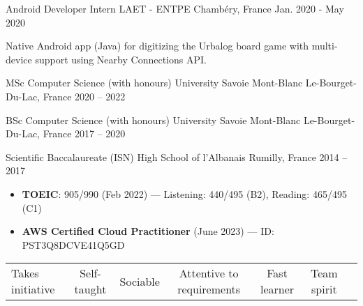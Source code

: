 \documentclass[11pt, a4paper]{awesome-cv}
\begin{document}
\begin{cventries}
  \cventry
    {Android Developer Intern}
    {LAET - ENTPE}
    {Chambéry, France}
    {Jan. 2020 - May 2020}
    {
      \vspace{2.0mm}
      \begin{cvitems}
        \item {Native Android app (Java) for digitizing the Urbalog board game with multi-device support using Nearby Connections API.}
      \end{cvitems}
    }

\end{cventries}


\begin{cventries}
  \cventry
    {MSc Computer Science (with honours)}
    {University Savoie Mont-Blanc}
    {Le-Bourget-Du-Lac, France}
    {2020 -- 2022}
    {}

  \cventry
    {BSc Computer Science (with honours)}
    {University Savoie Mont-Blanc}
    {Le-Bourget-Du-Lac, France}
    {2017 -- 2020}
    {}

  \cventry
    {Scientific Baccalaureate (ISN)}
    {High School of l'Albanais}
    {Rumilly, France}
    {2014 -- 2017}
    {}

\end{cventries}


\begin{itemize}
  \item {\textbf{TOEIC}: 905/990 (Feb 2022) — Listening: 440/495 (B2), Reading: 465/495 (C1)}
  \item {\textbf{AWS Certified Cloud Practitioner} (June 2023) — ID: PST3Q8DCVE41Q5GD}
\end{itemize}


\begin{tabular*}{\textwidth}{@{\extracolsep{\fill}}lcccccc}
Takes initiative & Self-taught & Sociable & Attentive to requirements & Fast learner & Team spirit \\
\end{tabular*}
\end{document}
